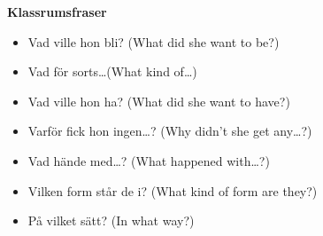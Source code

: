
\begin{flushleft}
    \textbf{Klassrumsfraser}
    \begin{itemize}
        \item Vad ville hon bli? (What did she want to be?)
        \item Vad för sorts\ldots (What kind of\ldots )
        \item Vad ville hon ha? (What did she want to have?)
        \item Varför fick hon ingen\ldots? (Why didn't she get any\ldots?)
        \item Vad hände med\ldots? (What happened with\ldots?)
        \item Vilken form står de i? (What kind of form are they?)
        \item På vilket sätt? (In what way?)
    \end{itemize}
\end{flushleft}

